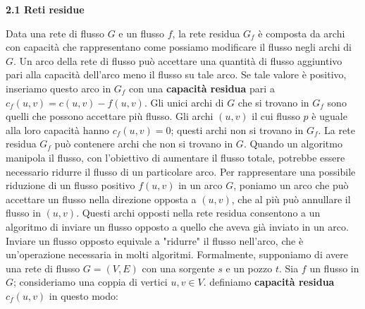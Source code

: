 \documentclass{article}
\begin{document}
\hfill
\begin{flushleft}
\begin{Large} \textbf{2.1 Reti residue} \end{Large}
\newline
\newline
Data una rete di flusso $G$ e un flusso $f$, la rete residua $G_f$ è composta da archi con capacità che rappresentano come possiamo modificare il flusso negli archi di $G$. Un arco della rete di flusso può accettare una quantità di flusso aggiuntivo pari alla capacità dell'arco meno il flusso su tale arco. Se tale valore è positivo, inseriamo questo arco in $G_f$ con una \textbf{capacità residua} pari a $c_f(u,v) = c(u,v) - f(u,v)$. Gli unici archi di $G$ che si trovano in $G_f$ sono quelli che possono accettare più flusso. Gli archi $(u,v)$ il cui flusso $p$ è uguale alla loro capacità hanno $c_f(u,v) = 0$; questi archi non si trovano in $G_f$. 
La rete residua $G_f$ può contenere archi che non si trovano in $G$. Quando un algoritmo manipola il flusso, con l'obiettivo di aumentare il flusso totale, potrebbe essere necessario ridurre il flusso di un particolare arco. Per rappresentare una possibile riduzione di un flusso positivo $f(u,v)$ in un arco $G$, poniamo un arco che può accettare un flusso nella direzione opposta a $(u,v)$, che al più può annullare il flusso in $(u,v)$. Questi archi opposti nella rete residua consentono a un algoritmo di inviare un flusso opposto a quello che aveva già inviato in un arco. Inviare un flusso opposto equivale a "ridurre" il flusso nell'arco, che è un'operazione necessaria in molti algoritmi.
\newline
Formalmente, supponiamo di avere una rete di flusso $G = (V,E)$ con una sorgente $s$ e un pozzo $t$. Sia $f$ un flusso in $G$; consideriamo una coppia di vertici $u,v \in V$. definiamo \textbf{capacità residua} $c_f(u,v)$ in questo modo: 
\newline
\end{flushleft} 
\end{document}
